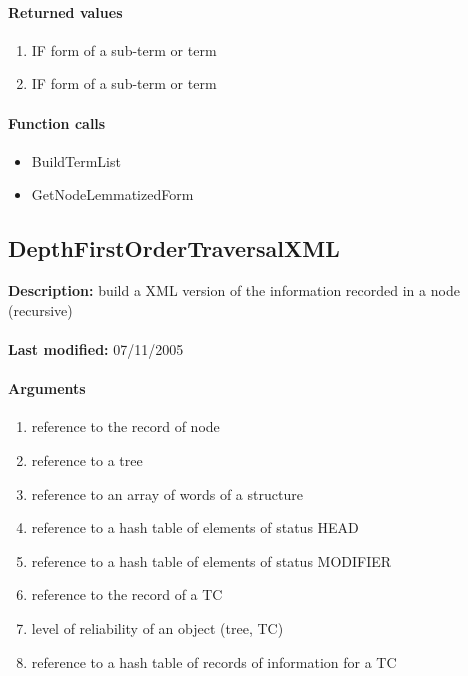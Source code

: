 \paragraph{Returned values}
\begin{enumerate}
\item IF form of a sub-term or term
\item IF form of a sub-term or term
\end{enumerate}

\paragraph{Function calls}
\begin{itemize}
\item BuildTermList
\item GetNodeLemmatizedForm
\end{itemize}

\subsection{DepthFirstOrderTraversalXML}
\textbf{Description:} build a XML version of the information recorded in a node (recursive)\\
\\\textbf{Last modified:} 07/11/2005

\paragraph{Arguments}
\begin{enumerate}
\item reference to the record of node
\item reference to a tree
\item reference to an array of words of a structure
\item reference to a hash table of elements of status HEAD
\item reference to a hash table of elements of status MODIFIER
\item reference to the record of a TC
\item level of reliability of an object (tree, TC)
\item reference to a hash table of records of information for a TC
\end{enumerate}

